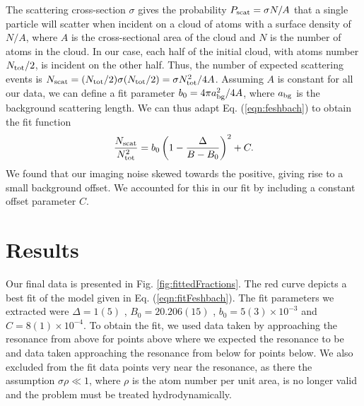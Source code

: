 The scattering cross-section $\sigma$ gives the probability $P_{\rm{scat}}=\sigma N/A$ that a single particle will scatter when incident on a cloud of atoms with a surface density of $N/A$, where $A$ is the cross-sectional area of the cloud and $N$ is the number of atoms in the cloud. In our case, each half of the initial cloud, with atoms number $N_{\rm{tot}}/2$, is incident on the other half. Thus, the number of expected scattering events is $N_{\rm{scat}}= (N_{\rm{tot}}/2) \sigma  (N_{\rm{tot}}/2)=\sigma N_{\rm{tot}}^2/4A$. Assuming $A$ is constant for all our data, we can define a fit parameter $b_0=4\pi a_{\rm{bg}}^2/4A$, where $a_{\rm{bg}}$ is the background scattering length. We can thus adapt Eq. (\ref{eqn:feshbach}) to obtain the fit function
\begin{equation}
\frac{N_{\rm{scat}}}{N_{\rm{tot}}^2}=b_0\left(1-\frac{\Delta}{B-B_0}\right)^2 + C.
\label{eqn:fitFeshbach}
\end{equation}
We found that our imaging noise skewed towards the positive, giving rise to a small background offset. We accounted for this in our fit by including a constant offset parameter $C$.


\section{Results}
Our final data is presented in Fig. \ref{fig:fittedFractions}. The red curve depicts a best fit of the model given in Eq. (\ref{eqn:fitFeshbach}). The fit parameters we extracted were $\Delta = 1(5)$  \mT{}, $B_0 = 20.206(15)$  \mT{}, $b_0 = 5(3)\times 10^{-3}$ and $C=8(1)\times 10^{-4}$. To obtain the fit, we used data taken by approaching the resonance from above for points above where we expected the resonance to be and data taken approaching the resonance from below for points below. We also excluded from the fit data points very near the resonance, as there the assumption $\sigma\rho\ll1$, where $\rho$ is the atom number per unit area, is no longer valid and the problem must be treated hydrodynamically.

